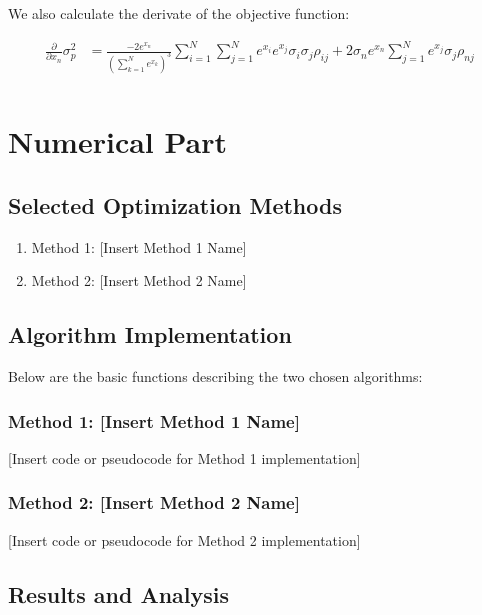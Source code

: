 \documentclass[12pt]{article}
\begin{document}
We also calculate the derivate of the objective function:

\begin{equation}
    \begin{aligned}
        \frac{\partial}{\partial x_n} \sigma_p^2 & = \frac{-2 e^{x_n}}{(\sum_{k=1}^{N} e^{x_k})^{3}} \sum_{i=1}^{N}\sum_{j=1}^{N} e^{x_i} e^{x_j}\sigma_i \sigma_j \rho_{ij} + 2 \sigma_n e^{x_n} \sum_{j=1}^{N} e^{x_j}\sigma_j \rho_{nj} \\
    \end{aligned}
\end{equation}

\section*{Numerical Part}

\subsection*{Selected Optimization Methods}





\begin{enumerate}
    \item Method 1: [Insert Method 1 Name]
    \item Method 2: [Insert Method 2 Name]
\end{enumerate}

\subsection*{Algorithm Implementation}

Below are the basic functions describing the two chosen algorithms:

\subsubsection*{Method 1: [Insert Method 1 Name]}

[Insert code or pseudocode for Method 1 implementation]

\subsubsection*{Method 2: [Insert Method 2 Name]}

[Insert code or pseudocode for Method 2 implementation]

\subsection*{Results and Analysis}
\end{document}
